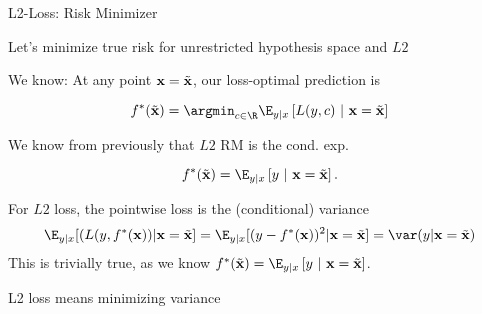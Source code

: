 \documentclass[11pt,compress,t,notes=noshow, xcolor=table]{beamer}
\begin{document}
\begin{framei}[sep=S]{L2-Loss: Risk Minimizer}

\item Let's minimize true risk for unrestricted hypothesis space and $L2$

\item We know: At any point $\mathbf{x} = \tilde{\mathbf{x}}$, our loss-optimal prediction is 

$$\fbayes(\xtil) = \argmin_{c \in \R} \E_{y|x}\left[L(y, c)~|~ \xv = \xtil \right]$$ 

\item We know from previously that $L2$ RM is the cond. exp. 

$$f^{\ast}(\xtil) = \E_{y|x} \left[y ~|~ \xv = \xtil \right]. $$



\item For $L2$ loss, the pointwise loss is the (conditional) variance
$$
\E_{y|x}[(L(y, \fbayes(\xv)) | \xv = \xtil ] =  \E_{y|x}[(y-\fbayes(\xv))^2 | \xv = \xtil ] =  \var(y | \xv = \xtil) 
$$
This is trivially true, as we know $f^{\ast}(\xtil) = \E_{y|x} \left[y ~|~ \xv = \xtil \right]$.

\end{framei}

\begin{frame}{L2 loss means minimizing variance}

  \vfill


\end{frame}
\end{document}
